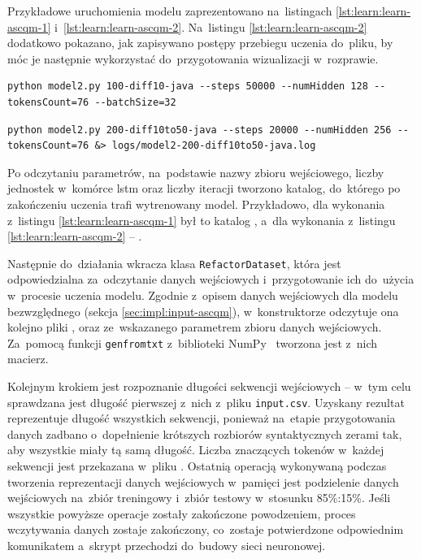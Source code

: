 \documentclass[twoside]{praca}
\begin{document}
Przykładowe uruchomienia modelu zaprezentowano na~listingach \ref{lst:learn:learn-ascqm-1} i~\ref{lst:learn:learn-ascqm-2}. Na~listingu \ref{lst:learn:learn-ascqm-2} dodatkowo pokazano, jak zapisywano postępy przebiegu uczenia do~pliku, by móc je następnie wykorzystać do~przygotowania wizualizacji w~rozprawie.

\begin{lstlisting}[frame=single,caption={Uruchomienie uczenia modelu aSCQM -- przykład 1},captionpos=b,label={lst:learn:learn-ascqm-1}]
python model2.py 100-diff10-java --steps 50000 --numHidden 128 --tokensCount=76 --batchSize=32
\end{lstlisting}

\begin{lstlisting}[frame=single,caption={Uruchomienie uczenia modelu aSCQM -- przykład 2},captionpos=b,label={lst:learn:learn-ascqm-2}]
python model2.py 200-diff10to50-java --steps 20000 --numHidden 256 --tokensCount=76 &> logs/model2-200-diff10to50-java.log
\end{lstlisting}

Po odczytaniu parametrów, na~podstawie nazwy zbioru wejściowego, liczby jednostek w~komórce \gls{lstm} oraz liczby iteracji tworzono katalog, do~którego po zakończeniu uczenia trafi wytrenowany model. Przykładowo, dla wykonania z~listingu \ref{lst:learn:learn-ascqm-1} był to katalog , a~dla wykonania z~listingu \ref{lst:learn:learn-ascqm-2} -- .

Następnie do~działania wkracza klasa \texttt{RefactorDataset}, która jest odpowiedzialna za~odczytanie danych wejściowych i~przygotowanie ich do~użycia w~procesie uczenia modelu. Zgodnie z~opisem danych wejściowych dla modelu bezwzględnego (sekcja \ref{sec:impl:input-ascqm}), w~konstruktorze odczytuje ona kolejno pliki ,  oraz  ze~wskazanego parametrem zbioru danych wejściowych. Za~pomocą funkcji \texttt{genfromtxt} z~biblioteki NumPy~\cite{numpy} tworzona jest z~nich macierz. 

Kolejnym krokiem jest rozpoznanie długości sekwencji wejściowych -- w~tym celu sprawdzana jest długość pierwszej z~nich z~pliku \texttt{input.csv}. Uzyskany rezultat reprezentuje długość wszystkich sekwencji, ponieważ na~etapie przygotowania danych zadbano o~dopełnienie krótszych rozbiorów syntaktycznych zerami tak, aby wszystkie miały tą samą długość. Liczba znaczących tokenów w~każdej sekwencji jest przekazana w~pliku . Ostatnią operacją wykonywaną podczas tworzenia reprezentacji danych wejściowych w~pamięci jest podzielenie danych wejściowych na~zbiór treningowy i~zbiór testowy w~stosunku 85\%:15\%. Jeśli wszystkie powyższe operacje zostały zakończone powodzeniem, proces wczytywania danych zostaje zakończony, co~zostaje potwierdzone odpowiednim komunikatem a~skrypt przechodzi do~budowy sieci neuronowej.
\end{document}
